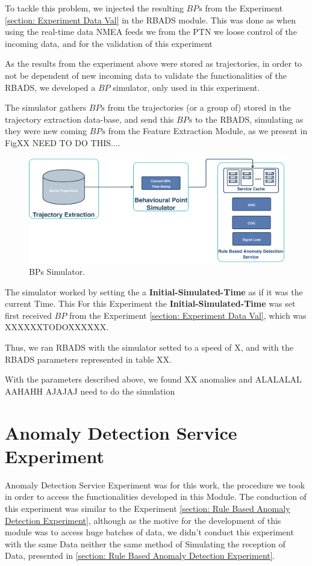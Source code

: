 To tackle this problem, we injected the resulting $BPs$ from the Experiment \ref{section: Experiment Data Val} in the RBADS module. This was done as when using the real-time data NMEA feeds we from the PTN we loose control of the incoming data, and for the validation of this experiment 

As the results from the experiment above were stored as trajectories, in order to not be dependent of new incoming data to validate the functionalities of the RBADS, we developed a $BP$ simulator, only used in this experiment.

The simulator gathers $BPs$ from the trajectories (or a group of) stored in the trajectory extraction data-base, and send this $BPs$ to the RBADS, simulating as they were new coming $BPs$ from the Feature Extraction Module, as we present in FigXX NEED TO DO THIS....

\begin{figure}[H]
	\centering
	\includegraphics[scale = .3]{figures/Ch5/SRM-Exp-Simulator.pdf}
    \caption{BPs Simulator.}
    \label{fig: Exp1 - Vessel Type Distribution}
\end{figure}



The simulator worked by setting the a \textbf{Initial-Simulated-Time} as if it was the current Time. This 
For this Experiment the \textbf{Initial-Simulated-Time} was set first received $BP$ from the Experiment \ref{section: Experiment Data Val}, which was XXXXXXTODOXXXXXX.

Thus, we ran RBADS with the simulator setted to a speed of X, and with the RBADS parameters represented in table XX.


With the parameters described above, we found XX anomalies and ALALALAL AAHAHH AJAJAJ need to do the simulation

\section{Anomaly Detection Service Experiment}
Anomaly Detection Service Experiment was for this work, the procedure we took in order to access the functionalities developed in this Module. The conduction of this experiment was similar to the Experiment \ref{section: Rule Based Anomaly Detection Experiment}, although as the motive for the development of this module was to access huge batches of data, we didn't conduct this experiment with the same Data neither the same method of Simulating the reception of Data, presented in \ref{section: Rule Based Anomaly Detection Experiment}.

